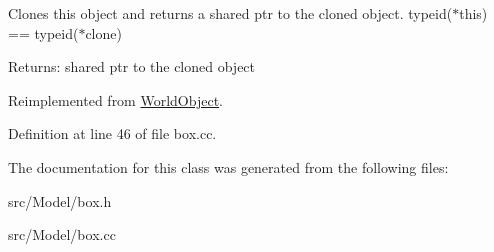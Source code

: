 Clones this object and returns a shared ptr to the cloned object. typeid($\ast$this) == typeid($\ast$clone) \begin{Desc}
\item[Returns:]shared ptr to the cloned object \end{Desc}


Reimplemented from \hyperlink{class_world_object_dba468299ce77ce5781e60081bf44b14}{WorldObject}.

Definition at line 46 of file box.cc.

The documentation for this class was generated from the following files:\begin{CompactItemize}
\item 
src/Model/box.h\item 
src/Model/box.cc\end{CompactItemize}
